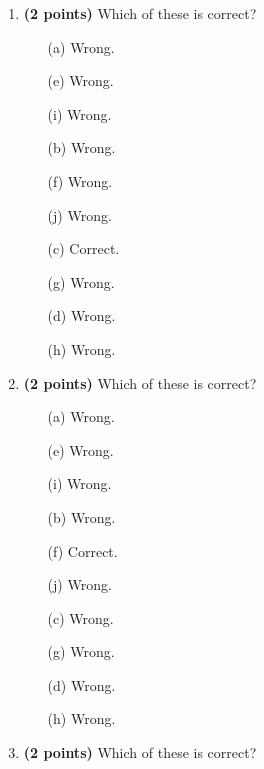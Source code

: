 \documentclass[12pt]{amsart}
\begin{document}
\newpage
\begin{enumerate}
\item {\bf (2 points)} 
 Which of these is correct?

\begin{minipage}[t]{1.0\linewidth}\begin{multicols}{4}\begin{itemize}\item[(a)]  Wrong. \item[(e)]  Wrong. \item[(i)]  Wrong. \item[(b)]  Wrong. \item[(f)]  Wrong. \item[(j)]  Wrong. \item[(c)]  Correct. \item[(g)]  Wrong. \item[] \item[(d)]  Wrong. \item[(h)]  Wrong. \item[] \end{itemize}\end{multicols}\end{minipage} \vfill 
\item {\bf (2 points)} 
 Which of these is correct?

\begin{minipage}[t]{1.0\linewidth}\begin{multicols}{4}\begin{itemize}\item[(a)]  Wrong. \item[(e)]  Wrong. \item[(i)]  Wrong. \item[(b)]  Wrong. \item[(f)]  Correct. \item[(j)]  Wrong. \item[(c)]  Wrong. \item[(g)]  Wrong. \item[] \item[(d)]  Wrong. \item[(h)]  Wrong. \item[] \end{itemize}\end{multicols}\end{minipage} \vfill 
\item {\bf (2 points)} 
 Which of these is correct?


\end{enumerate}
\end{document}
